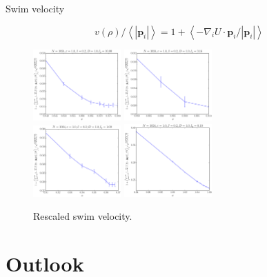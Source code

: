 \documentclass{beamer}
\begin{document}
\begin{frame}{Swim velocity}

\begin{equation}
v(\rho)/\left<|\boldsymbol{p}_i|\right> = 1 + \left<-\nabla_i U \cdot \boldsymbol{p}_i/|\boldsymbol{p}_i|\right>
\end{equation}

\begin{figure}
\centering
\includegraphics[width=0.30\textwidth]{fo_No1024_Tl1000_Rj1000.eps}
\includegraphics[width=0.30\textwidth]{fo_No1024_Tl1000_Rk1000.eps}\\
\includegraphics[width=0.30\textwidth]{fo_No1024_Tl1000_Rl1000.eps}
\includegraphics[width=0.30\textwidth]{fo_No1024_Tl1000_Rn1000.eps}
\caption{Rescaled swim velocity.}
\end{figure}

\vspace{-10pt}

\end{frame}

\section{Outlook}
\end{document}
